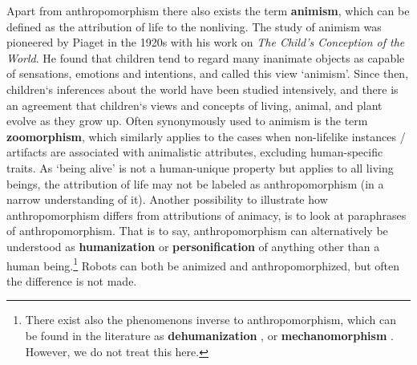 \documentclass{frontiersSCNS} %
\begin{document}
Apart from anthropomorphism there also exists the term \textbf{animism}, which can be defined as the attribution of life to the nonliving. The study of animism was pioneered by Piaget in the 1920s with his work on \textit{The Child's Conception of the  World}. He found that children tend to regard many inanimate objects as capable of sensations, emotions and intentions, and called this view `animism'. Since then, children`s inferences about the world have been studied intensively, and there is an agreement that children`s views and concepts of living, animal, and plant evolve as they grow up. Often synonymously used to animism is the term \textbf{zoomorphism}, which similarly applies to the cases when non-lifelike instances / artifacts are associated with animalistic attributes, excluding human-specific traits.
As `being alive' is not a human-unique property but applies to all living beings, the attribution of life may not be labeled as anthropomorphism (in a narrow understanding of it).
Another possibility to illustrate how anthropomorphism differs from attributions of animacy, is to look at paraphrases of anthropomorphism. That is to say, 
anthropomorphism can alternatively be understood as \textbf{humanization} or 
\textbf{personification} of anything other than a human being.\footnote{There exist also the phenomenons inverse to anthropomorphism, which can be found in the literature as \textbf{dehumanization} \citep{haslam_dehumanization:_2006}, or \textbf{mechanomorphism} \citep{caporael_anthropomorphism_1986}. However, we do not treat this here.} 
Robots can both be animized and anthropomorphized, but often the difference is not made.

%
%
%  
%
\end{document}
